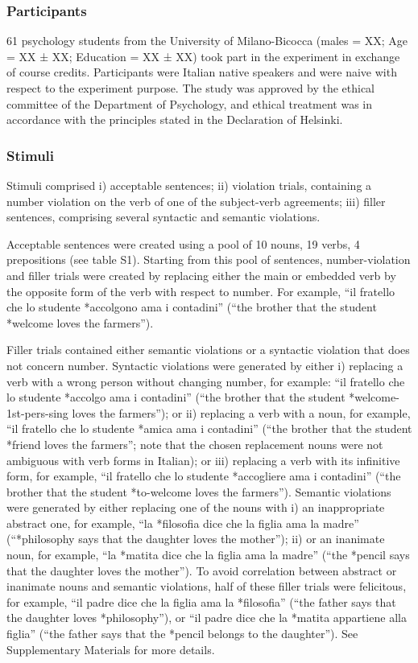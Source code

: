 \subsubsection{Participants}
61 psychology students from the University of Milano-Bicocca (males = XX; Age = XX ± XX; Education = XX ± XX) took part in the experiment in exchange of course credits. Participants were Italian native speakers and were naive with respect to the experiment purpose. The study was approved by the ethical committee of the Department of Psychology, and ethical treatment was in accordance with the principles stated in the Declaration of Helsinki.

\subsubsection{Stimuli}
Stimuli comprised i) acceptable sentences; ii) violation trials, containing a number violation on the verb of one of the subject-verb agreements; iii) filler sentences, comprising several syntactic and semantic violations. 

Acceptable sentences were created using a pool of 10 nouns, 19 verbs, 4 prepositions (see table S1).
Starting from this pool of sentences, number-violation and filler trials were created by replacing either the main or embedded verb by the opposite form of the verb with respect to number. For example, ``il fratello che lo studente *accolgono ama i contadini'' (``the brother that the student *welcome loves the farmers'').

Filler trials contained either semantic violations or a syntactic violation that does not concern number. Syntactic violations were generated by either i) replacing a verb with a wrong person without changing number, for example: ``il fratello che lo studente *accolgo ama i contadini'' (``the brother that the student *welcome-1st-pers-sing loves the farmers''); or ii) replacing a verb with a noun, for example, ``il fratello che lo studente *amica ama i contadini'' (``the brother that the student *friend loves the farmers''; note that the chosen replacement nouns were not ambiguous with verb forms in Italian); or iii) replacing a verb with its infinitive form, for example, ``il fratello che lo studente *accogliere ama i contadini'' (``the brother that the student *to-welcome loves the farmers''). Semantic violations were generated by either replacing one of the nouns with i) an inappropriate abstract one, for example, ``la *filosofia dice che la figlia ama la madre'' (``*philosophy says that the daughter loves the mother''); ii) or an inanimate noun, for example, ``la *matita dice che la figlia ama la madre'' (``the *pencil says that the daughter loves the mother''). To avoid correlation between abstract or inanimate nouns and semantic violations, half of these filler trials were felicitous, for example, ``il padre dice che la figlia ama la *filosofia'' (``the father says that the daughter loves *philosophy''), or ``il padre dice che la *matita appartiene alla figlia'' (``the father says that the *pencil belongs to the daughter''). See Supplementary Materials for more details.

